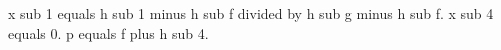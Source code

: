 x sub 1 equals h sub 1 minus h sub f divided by h sub g minus h sub f.  
x sub 4 equals 0.  
p equals f plus h sub 4.